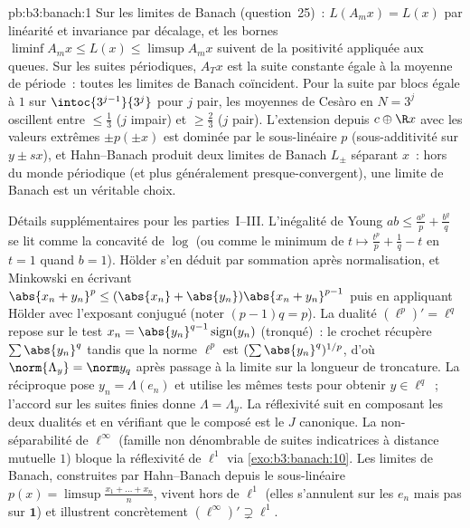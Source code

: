 \begin{solution}{pb:b3:banach:1}
Sur les limites de Banach (question~25)~: $L(A_mx) = L(x)$
par linéarité et invariance par décalage, et les bornes
$\liminf A_mx \leq L(x) \leq \limsup A_mx$ suivent de la
positivité appliquée aux queues. Sur les suites périodiques,
$A_Tx$ est la suite constante égale à la moyenne de période~:
toutes les limites de Banach coïncident. Pour la suite par
blocs égale à $1$ sur $\intoc{3^{j-1}}{3^j}$ pour $j$ pair,
les moyennes de Cesàro en $N = 3^j$ oscillent entre $\leq
\frac13$ ($j$ impair) et $\geq \frac23$ ($j$ pair).
L'extension depuis $c \oplus \R x$ avec les valeurs
extrêmes $\pm p(\pm x)$ est dominée par le sous-linéaire
$p$ (sous-additivité sur $y \pm sx$), et Hahn--Banach
produit deux limites de Banach $L_\pm$ séparant $x$~: hors
du monde périodique (et plus généralement
presque-convergent), une limite de Banach est un véritable
choix.


Détails supplémentaires pour les parties~I--III. L'inégalité
de Young $ab \leq \frac{a^p}p + \frac{b^q}q$ se lit comme
la concavité de $\log$ (ou comme le minimum de $t \mapsto
\frac{t^p}p + \frac1q - t$ en $t = 1$ quand $b = 1$).
Hölder s'en déduit par sommation après normalisation, et
Minkowski en écrivant $\abs{x_n+y_n}^p \leq
(\abs{x_n}+\abs{y_n})\abs{x_n+y_n}^{p-1}$ puis en appliquant
Hölder avec l'exposant conjugué (noter $(p-1)q = p$). La
dualité $(\ell^p)' = \ell^q$ repose sur le test
$x_n = \abs{y_n}^{q-1}\operatorname{sign}(y_n)$ (tronqué)~:
le crochet récupère $\sum\abs{y_n}^q$ tandis que la norme
$\ell^p$ est $(\sum\abs{y_n}^q)^{1/p}$, d'où
$\norm{\Lambda_y} = \norm y_q$ après passage à la limite
sur la longueur de troncature. La réciproque pose $y_n =
\Lambda(e_n)$ et utilise les mêmes tests pour obtenir $y
\in \ell^q$~; l'accord sur les suites finies  donne
$\Lambda = \Lambda_y$. La réflexivité suit en composant les
deux dualités et en vérifiant que le composé est le $J$
canonique. La non-séparabilité de $\ell^\infty$ (famille non
dénombrable de suites indicatrices à distance mutuelle $1$)
bloque la réflexivité de $\ell^1$ via
\cref{exo:b3:banach:10}. Les limites de Banach, construites
par Hahn--Banach depuis le sous-linéaire $p(x) =
\limsup\frac{x_1+\dots+x_n}{n}$, vivent hors de $\ell^1$
(elles s'annulent sur les $e_n$ mais pas sur $\mathbf 1$) et
illustrent concrètement $(\ell^\infty)' \supsetneq
\ell^1$.

\end{solution}
